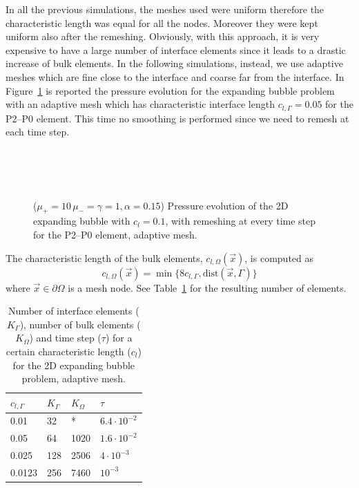 \documentclass[a4paper,12pt,onecolumn]{article}
\begin{document}
In all the previous simulations, the meshes used were uniform therefore the characteristic length was equal for all the nodes. Moreover they were kept uniform also after the remeshing. Obviously, with this approach, it is very expensive to have a large number of interface elements since it leads to a drastic increase of bulk elements. In the following simulations, instead, we use adaptive meshes which are fine close to the interface and coarse far from the interface. In Figure~\ref{fig:expanding_bubble_adaptive} is reported the pressure evolution for the expanding bubble problem with an adaptive mesh which has characteristic interface length $c_{l,\Gamma}=0.05$ for the P2--P0 element. This time no smoothing is performed since we need to remesh at each time step.
\begin{figure}[htbp]
  \centering
  \\
  \quad
  \\
  \quad
  \\
  \caption{($\mu_+ = 10\,\mu_- = \gamma = 1,\alpha = 0.15$) Pressure evolution of the 2D expanding bubble with $c_l=0.1$, with remeshing at every time step for the P2--P0 element, adaptive mesh.}
  \label{fig:expanding_bubble_adaptive}
\end{figure}

The characteristic length of the bulk elements, $c_{l,\Omega}(\vec{x})$, is computed as
\begin{equation}\label{eq:adaptive_criteria}
 c_{l,\Omega}(\vec{x})=\min\big\{8c_{l,\Gamma},\textrm{dist}(\vec{x},\Gamma)\big\}
\end{equation}
where $\vec{x}\in\partial\Omega$ is a mesh node. See Table~\ref{tab:expandingbubble2Delements_adaptive} for the resulting number of elements. 
\begin{table}
 \center
\begin{tabular}{llll}
\hline
$c_{l,\Gamma}$ & $K_\Gamma$ & $K_\Omega$ & $\tau$ \\
\hline
0.01 & 32 & * & $6.4\cdot10^{-2}$ \\
0.05 & 64 & 1020 & $1.6\cdot10^{-2}$ \\
0.025 & 128 & 2506 & $4\cdot10^{-3}$\\
0.0123 & 256 & 7460 & $10^{-3}$\\
\hline
\end{tabular}
\caption{Number of interface elements ($K_\Gamma$), number of bulk elements ($K_\Omega$) and time step ($\tau$) for a certain characteristic length ($c_l$) for the 2D expanding bubble problem, adaptive mesh.}
\label{tab:expandingbubble2Delements_adaptive}
\end{table}
\end{document}
